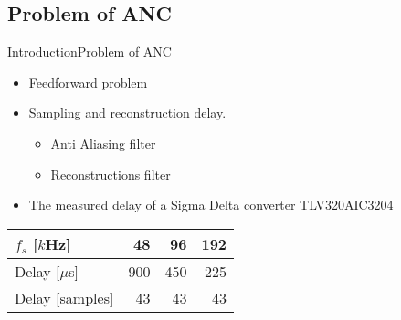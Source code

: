 \subsection{Problem of ANC}
\begin{frame}{Introduction}{Problem of ANC}		
	\begin{itemize}
		\item Feedforward problem
		\item Sampling and reconstruction delay.
		\begin{itemize}
			\item Anti Aliasing filter
			\item Reconstructions filter
		\end{itemize}
		\item The measured delay of a Sigma Delta converter TLV320AIC3204
	\end{itemize}
	\begin{table}[H]
	\centering
	\begin{tabular}{|l|r|r|r|}
	\hline
	$f_s$ {[}$k$Hz{]} & 48 & 96 & 192 \\ \hline
	Delay {[}$\mu$s{]} & 900 & 450 & 225 \\ \hline
	Delay {[}samples{]} & 43 & 43 & 43 \\ \hline
	\end{tabular}
	\end{table}
\end{frame}






